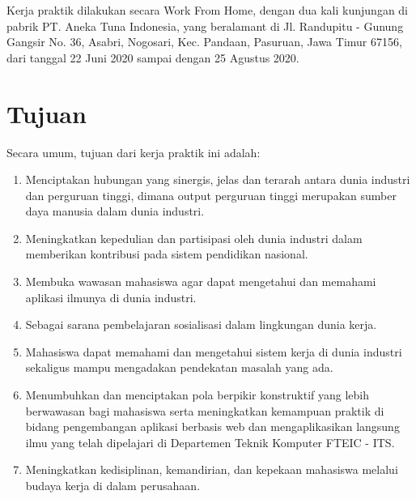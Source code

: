 Kerja praktik dilakukan secara Work From Home, dengan dua kali kunjungan di pabrik PT. Aneka Tuna Indonesia, yang beralamant di Jl. Randupitu - Gunung Gangsir No. 36, Asabri, Nogosari, Kec. Pandaan, Pasuruan, Jawa Timur 67156, dari tanggal 22 Juni 2020 sampai dengan 25 Agustus 2020.
\vspace{0.5ex}

\section{Tujuan}
\vspace{1ex}

Secara umum, tujuan dari kerja praktik ini adalah:
\vspace{0.5ex}

\begin{enumerate}[nolistsep]

  \item Menciptakan hubungan yang sinergis, jelas dan terarah antara dunia industri dan perguruan tinggi, dimana output perguruan tinggi merupakan sumber daya manusia dalam dunia industri.
  \vspace{0.5ex}

  \item Meningkatkan kepedulian dan partisipasi oleh dunia industri dalam memberikan kontribusi pada sistem pendidikan nasional.
  \vspace{0.5ex}

  \item Membuka wawasan mahasiswa agar dapat mengetahui dan memahami aplikasi ilmunya di dunia industri.
  \vspace{0.5ex}

  \item Sebagai sarana pembelajaran sosialisasi dalam lingkungan dunia kerja.
  \vspace{0.5ex}

  \item Mahasiswa dapat memahami dan mengetahui sistem kerja di dunia industri sekaligus mampu mengadakan pendekatan masalah yang ada.
  \vspace{0.5ex}

  \item Menumbuhkan dan menciptakan pola berpikir konstruktif yang lebih berwawasan bagi mahasiswa serta meningkatkan kemampuan praktik di bidang pengembangan aplikasi berbasis web dan mengaplikasikan langsung ilmu yang telah dipelajari di Departemen Teknik Komputer FTEIC - ITS.
  \vspace{0.5ex}

  \item Meningkatkan kedisiplinan, kemandirian, dan kepekaan mahasiswa melalui budaya kerja di dalam perusahaan.
  \vspace{0.5ex}

\end{enumerate}
\vspace{0.5ex}

